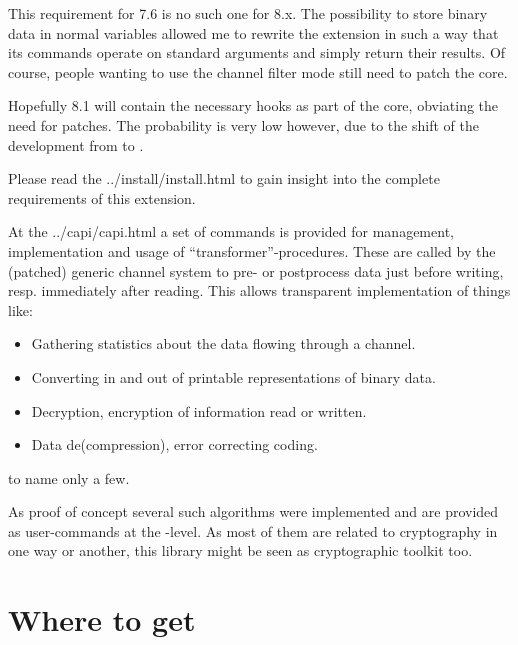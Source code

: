 \documentclass {report}
\def\installman{\htmladdnormallink {installation manual} {../install/install.html}}
\def\capi{      \htmladdnormallink {C-level} {../capi/capi.html}}
\begin{document}
This requirement for \tcl{} 7.6 is no such one for \tcl{} 8.x. The
possibility to store binary data in normal variables allowed me to
rewrite the extension in such a way that its commands operate on
standard arguments and simply return their results. Of course, people
wanting to use the channel filter mode still need to patch the core.

Hopefully \tcl{} 8.1 will contain the necessary hooks as part of the
core, obviating the need for patches. The probability is very low
however, due to the shift of the development from \sun{} to
\scriptics{}.

Please read the \installman{} to gain insight into the complete
requirements of this extension.

At the \capi{} a set of commands is provided for management,
implementation and usage of ``transformer''-procedures. These are
called by the (patched) generic channel system to pre- or postprocess
data just before writing, resp. immediately after reading. This allows
transparent implementation of things like:

\begin {itemize}
\item	Gathering statistics about the data flowing through a channel.

\item	Converting in and out of printable representations of binary
	data.
\item	Decryption, encryption of information read or written.
\item	Data de(compression), error correcting coding.
\end   {itemize}
to name only a few.

As proof of concept several such algorithms were implemented and are
provided as user-commands at the \tcl{}-level. As most of them are
related to cryptography in one way or another, this library might be
seen as cryptographic toolkit too.


\chapter {Where to get}
\end{document}
